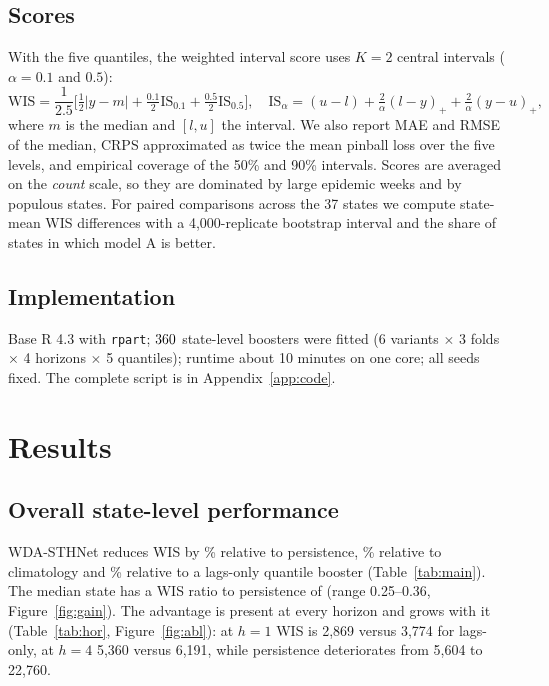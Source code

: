 \documentclass[11pt,a4paper]{article}
\begin{document}
\subsection{Scores}
With the five quantiles, the weighted interval score uses $K=2$ central intervals ($\alpha=0.1$ and $0.5$):
\begin{equation}
\mathrm{WIS}=\frac{1}{2.5}\Big[\tfrac12|y-m|+\tfrac{0.1}{2}\mathrm{IS}_{0.1}+\tfrac{0.5}{2}\mathrm{IS}_{0.5}\Big],\quad \mathrm{IS}_\alpha=(u-l)+\tfrac2\alpha(l-y)_++\tfrac2\alpha(y-u)_+ ,
\end{equation}
where $m$ is the median and $[l,u]$ the interval. We also report MAE and RMSE of the median, CRPS approximated as twice the mean pinball loss over the five levels, and empirical coverage of the 50\% and 90\% intervals. Scores are averaged on the \emph{count} scale, so they are dominated by large epidemic weeks and by populous states. For paired comparisons across the 37 states we compute state-mean WIS differences with a 4{,}000-replicate bootstrap interval and the share of states in which model A is better.

\subsection{Implementation}
Base R 4.3 with \texttt{rpart}; $360$ state-level boosters were fitted (6 variants $\times$ 3 folds $\times$ 4 horizons $\times$ 5 quantiles); runtime about 10 minutes on one core; all seeds fixed. The complete script is in Appendix~\ref{app:code}.

\section{Results}\label{sec:results}
\subsection{Overall state-level performance}
\begin{table}[H]\centering\footnotesize
\resizebox{\textwidth}{!}{}
\caption{State-level forecasts of weekly cases, pooled over 37 states, 3 held-out seasons, 43 origins and 4 horizons (19{,}092 forecasts per model). Scores on the count scale; coverage is the empirical coverage of the nominal 50\% and 90\% intervals. The last column is WIS restricted to epidemic-phase origins.}\label{tab:main}
\end{table}
WDA-STHNet reduces WIS by \gainVsPersist\% relative to persistence, \gainVsClim\% relative to climatology and \gainVsLags\% relative to a lags-only quantile booster (Table~\ref{tab:main}). The median state has a WIS ratio to persistence of \relPersistMed{} (range 0.25--0.36, Figure~\ref{fig:gain}). The advantage is present at every horizon and grows with it (Table~\ref{tab:hor}, Figure~\ref{fig:abl}): at $h=1$ WIS is 2,869 versus 3,774 for lags-only, at $h=4$ 5,360 versus 6,191, while persistence deteriorates from 5,604 to 22,760.
\end{document}
